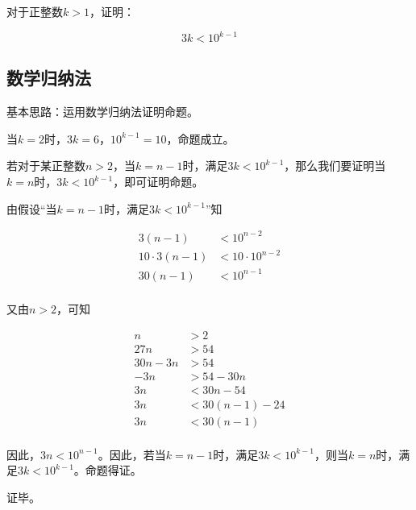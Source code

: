

对于正整数$k > 1$，证明：

\[ 3k < 10^{k - 1} \]

\subsection{数学归纳法}

基本思路：运用数学归纳法证明命题。

当$k = 2$时，$3k = 6$，$10^{k - 1} = 10$，命题成立。

若对于某正整数$n > 2$，当$k = n - 1$时，满足$3k < 10^{k - 1}$，那么我们要证明当$k = n$时，$3k < 10^{k - 1}$，即可证明命题。

由假设“当$k = n - 1$时，满足$3k < 10^{k - 1}$”知

\begin{align*}
  3(n - 1) &< 10^{n - 2} \\
  10\cdot3(n - 1) &< 10\cdot10^{n - 2} \\
  30(n - 1) &< 10^{n - 1} \\
\end{align*}

又由$n > 2$，可知

\begin{align*}
  n &> 2 \\
  27n &> 54 \\
  30n - 3n &> 54 \\
  -3n &> 54 - 30n \\
  3n &< 30n - 54 \\
  3n &< 30(n - 1) - 24 \\
  3n &< 30(n - 1) \\
\end{align*}

因此，$3n < 10^{n - 1}$。因此，若当$k = n - 1$时，满足$3k < 10^{k - 1}$，则当$k = n$时，满足$3k < 10^{k - 1}$。命题得证。

证毕。
